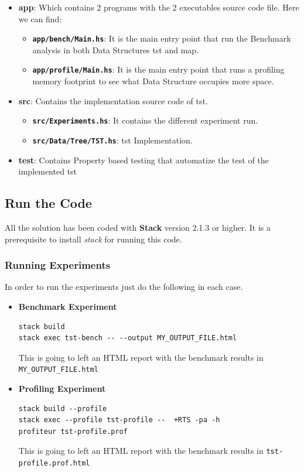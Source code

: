 \documentclass[12pt, a4paper]{article}
\begin{document}
\begin{itemize}
  \item \textbf{app}: Which contains 2 programs with the 2 executables source code file. Here we can find:
    \begin{itemize}
      \item \textbf{\texttt{app/bench/Main.hs}}: It is the main entry point that run the Benchmark analysis in both Data Structures \acrshort{tst} and \acrshort{map}.
      \item \textbf{\texttt{app/profile/Main.hs}}: It is the main entry point that runs a profiling memory footprint to see what Data Structure occupies more space.
    \end{itemize}
  \item \textbf{src}: Contains the implementation source code of \acrshort{tst}.
    \begin{itemize}
      \item \textbf{\texttt{src/Experiments.hs}}: It contains the different experiment run.
      \item \textbf{\texttt{src/Data/Tree/TST.hs}}: \acrshort{tst} Implementation.
    \end{itemize}
  \item \textbf{test}: Contains Property based testing that automatize the test of the implemented \acrshort{tst}
\end{itemize}

\subsection{Run the Code}
All the solution has been coded with \textbf{Stack} \cite{stack} version 2.1.3 or higher. It is a prerequisite to install \textit{stack} for running this code.

\subsubsection{Running Experiments}
In order to run the experiments just do the following in each case.

\begin{itemize}
  \item \textbf{Benchmark Experiment}

\begin{verbatim}
stack build
stack exec tst-bench -- --output MY_OUTPUT_FILE.html
\end{verbatim}

This is going to left an HTML report with the benchmark results in \texttt{MY_OUTPUT_FILE.html}

\item \textbf{Profiling Experiment}

\begin{verbatim}
stack build --profile
stack exec --profile tst-profile --  +RTS -pa -h
profiteur tst-profile.prof
\end{verbatim}

This is going to left an HTML report with the benchmark results in \texttt{tst-profile.prof.html}

\end{itemize}
\end{document}
